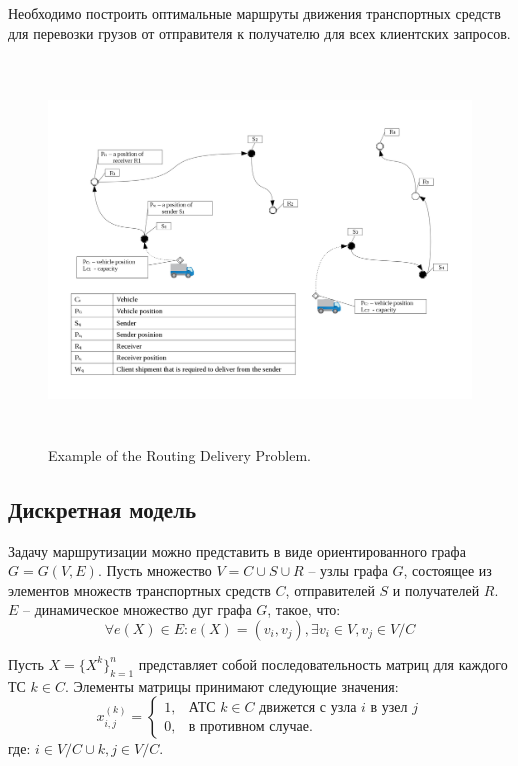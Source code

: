 \documentclass[]{TAACpaper}
\begin{document}
Необходимо построить оптимальные маршруты движения транспортных средств для перевозки грузов от отправителя к получателю для всех клиентских запросов.

\begin{figure}[h]
	\hfil\includegraphics[height=4.0in]{images/scheme}\hfil
	\caption
	{
		Example of the Routing Delivery Problem.
	}
	\label{aba:fig1}
\end{figure}

\subsection{Дискретная модель}
Задачу маршрутизации можно представить в виде ориентированного графа $G=G(V,E)$. Пусть множество $V=C\cup{S}\cup{R}$ -- узлы графа $G$,  состоящее из элементов множеств транспортных средств $C$, отправителей $S$ и получателей $R$. $E$ -- динамическое множество дуг графа $G$, такое, что:
\begin{equation}
\forall e(X) \in E: e(X) = (v_i,v_j), \exists v_i \in V, v_j \in V/C
\end{equation}

Пусть $X = \{X^k\}^n_{k=1}$ представляет собой последовательность матриц для каждого ТС $k \in C$. Элементы матрицы принимают следующие значения:
\begin{equation}
  x^{(k)}_{i,j} = 
    \begin{cases}
	  1,&\text{АТС $k \in C$ движется с узла $i$ в узел $j$}\\
	  0,&\text{в противном случае.}
    \end{cases}
\end{equation}
где: $i\in{V/C \cup {k}}, j \in V/C$.
\end{document}
